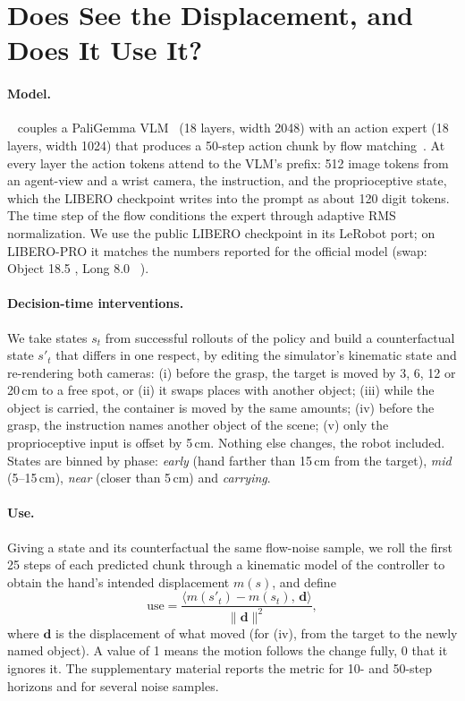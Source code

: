 \section{Does \pizf See the Displacement, and Does It Use It?}
\label{sec:probing}

\paragraph{Model.}
\pizf~\cite{pi2025pi05} couples a PaliGemma VLM~\cite{beyer2024paligemma} (18 layers, width 2048) with an action expert
(18 layers, width 1024) that produces a 50-step action chunk by flow matching~\cite{lipman2023flow}.
At every layer the action tokens attend to the VLM's prefix: 512 image tokens from an agent-view and a wrist camera, the
instruction, and the proprioceptive state, which the LIBERO checkpoint writes into the prompt as about 120 digit tokens.
The time step of the flow conditions the expert through adaptive RMS normalization.
We use the public LIBERO checkpoint in its LeRobot port; on LIBERO-PRO it matches the numbers reported for the official
model (swap: Object 18.5 , Long 8.0 ~\cite{chen2026ect}).

\paragraph{Decision-time interventions.}
We take states $s_t$ from successful rollouts of the policy and build a counterfactual state $s'_t$ that differs in one
respect, by editing the simulator's kinematic state and re-rendering both cameras: (i) before the grasp, the target is
moved by 3, 6, 12 or 20\,cm to a free spot, or (ii) it swaps places with another object; (iii) while the object is
carried, the container is moved by the same amounts; (iv) before the grasp, the instruction names another object of the
scene; (v) only the proprioceptive input is offset by 5\,cm.
Nothing else changes, the robot included.
States are binned by phase: \emph{early} (hand farther than 15\,cm from the target), \emph{mid} (5--15\,cm), \emph{near}
(closer than 5\,cm) and \emph{carrying}.

\paragraph{Use.}
Giving a state and its counterfactual the same flow-noise sample, we roll the first 25 steps of each predicted chunk
through a kinematic model of the controller to obtain the hand's intended displacement $m(s)$, and define
\begin{equation}
\mathrm{use} = \frac{\langle m(s'_t) - m(s_t),\, \mathbf{d} \rangle}{\lVert \mathbf{d} \rVert^2},
\end{equation}
where $\mathbf{d}$ is the displacement of what moved (for (iv), from the target to the newly named object).
A value of 1 means the motion follows the change fully, 0 that it ignores it. The supplementary material reports the
metric for 10- and 50-step horizons and for several noise samples.

